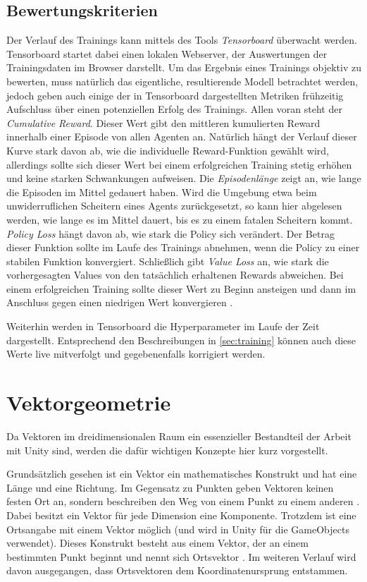 \subsection{Bewertungskriterien}
\label{sec:bewertung}
Der Verlauf des Trainings kann mittels des Tools \emph{Tensorboard} überwacht werden.
Tensorboard startet dabei einen lokalen Webserver, der Auswertungen der Trainingsdaten im Browser darstellt.
Um das Ergebnis eines Trainings objektiv zu bewerten, muss natürlich das eigentliche, resultierende Modell betrachtet werden, jedoch geben auch einige der in Tensorboard dargestellten Metriken frühzeitig Aufschluss über einen potenziellen Erfolg des Trainings.
Allen voran steht der \emph{Cumulative Reward}.
Dieser Wert gibt den mittleren kumulierten Reward innerhalb einer Episode von allen Agenten an.
Natürlich hängt der Verlauf dieser Kurve stark davon ab, wie die individuelle Reward-Funktion gewählt wird, allerdings sollte sich dieser Wert bei einem erfolgreichen Training stetig erhöhen und keine starken Schwankungen aufweisen.
Die \emph{Episodenlänge} zeigt an, wie lange die Episoden im Mittel gedauert haben.
Wird die Umgebung etwa beim unwiderruflichen Scheitern eines Agents zurückgesetzt, so kann hier abgelesen werden, wie lange es im Mittel dauert, bis es zu einem fatalen Scheitern kommt.
\emph{Policy Loss} hängt davon ab, wie stark die Policy sich verändert.
Der Betrag dieser Funktion sollte im Laufe des Trainings abnehmen, wenn die Policy zu einer stabilen Funktion konvergiert.
Schließlich gibt \emph{Value Loss} an, wie stark die vorhergesagten Values von den tatsächlich erhaltenen Rewards abweichen.
Bei einem erfolgreichen Training sollte dieser Wert zu Beginn ansteigen und dann im Anschluss gegen einen niedrigen Wert konvergieren \cite{aurelian2018,untiyMetrics}.

Weiterhin werden in Tensorboard die Hyperparameter im Laufe der Zeit dargestellt.
Entsprechend den Beschreibungen in \autoref{sec:training} können auch diese Werte live mitverfolgt und gegebenenfalls korrigiert werden.


\section{Vektorgeometrie}
Da Vektoren im dreidimensionalen Raum ein essenzieller Bestandteil der Arbeit mit Unity sind, werden die dafür wichtigen Konzepte hier kurz vorgestellt.

Grundsätzlich gesehen ist ein Vektor ein mathematisches Konstrukt und hat eine Länge und eine Richtung.
Im Gegensatz zu Punkten geben Vektoren keinen festen Ort an, sondern beschreiben den Weg von einem Punkt zu einem anderen \cite[6]{kohn2012}.
Dabei besitzt ein Vektor für jede Dimension eine Komponente.
Trotzdem ist eine Ortsangabe mit einem Vektor möglich (und wird in Unity für die GameObjects verwendet).
Dieses Konstrukt besteht aus einem Vektor, der an einem bestimmten Punkt beginnt und nennt sich Ortsvektor \cite[21]{kohn2012}.
Im weiteren Verlauf wird davon ausgegangen, dass Ortsvektoren dem Koordinatenursprung entstammen.

